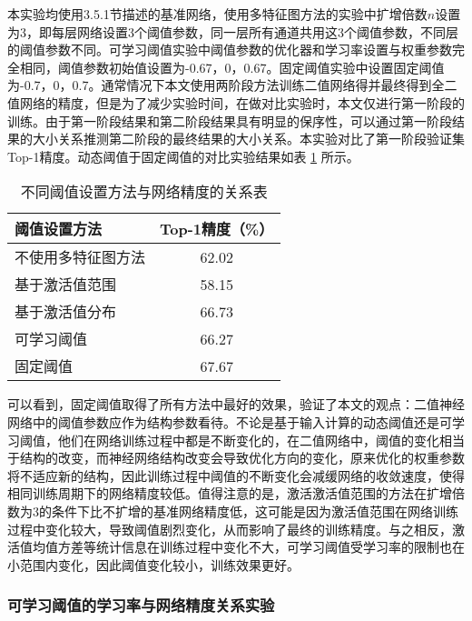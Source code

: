 本实验均使用3.5.1节描述的基准网络，使用多特征图方法的实验中扩增倍数$n$设置为3，即每层网络设置3个阈值参数，同一层所有通道共用这3个阈值参数，不同层的阈值参数不同。可学习阈值实验中阈值参数的优化器和学习率设置与权重参数完全相同，阈值参数初始值设置为-0.67，0，0.67。固定阈值实验中设置固定阈值为-0.7，0，0.7。通常情况下本文使用两阶段方法训练二值网络得并最终得到全二值网络的精度，但是为了减少实验时间，在做对比实验时，本文仅进行第一阶段的训练。由于第一阶段结果和第二阶段结果具有明显的保序性，可以通过第一阶段结果的大小关系推测第二阶段的最终结果的大小关系。本实验对比了第一阶段验证集Top-1精度。动态阈值于固定阈值的对比实验结果如表 \ref{tab:1} 所示。

\renewcommand\arraystretch{1.2}
\begin{table}[htb]
  \vspace{6pt}
  \centering
  \caption{不同阈值设置方法与网络精度的关系表}
  \label{tab:1}
  \begin{tabular}{lc}
    \toprule
    阈值设置方法   & Top-1精度（\%）    \\
    \midrule
    不使用多特征图方法 & 62.02 \\
    基于激活值范围 & 58.15 \\
    基于激活值分布 & 66.73   \\
    可学习阈值   & 66.27       \\
    固定阈值     & 67.67       \\
    \bottomrule
  \end{tabular}
  \vspace{6pt}
\end{table}

可以看到，固定阈值取得了所有方法中最好的效果，验证了本文的观点：二值神经网络中的阈值参数应作为结构参数看待。不论是基于输入计算的动态阈值还是可学习阈值，他们在网络训练过程中都是不断变化的，在二值网络中，阈值的变化相当于结构的改变，而神经网络结构改变会导致优化方向的变化，原来优化的权重参数将不适应新的结构，因此训练过程中阈值的不断变化会减缓网络的收敛速度，使得相同训练周期下的网络精度较低。值得注意的是，激活激活值范围的方法在扩增倍数为3的条件下比不扩增的基准网络精度低，这可能是因为激活值范围在网络训练过程中变化较大，导致阈值剧烈变化，从而影响了最终的训练精度。与之相反，激活值均值方差等统计信息在训练过程中变化不大，可学习阈值受学习率的限制也在小范围内变化，因此阈值变化较小，训练效果更好。

\subsubsection{可学习阈值的学习率与网络精度关系实验}

